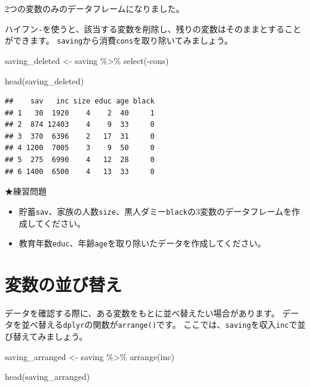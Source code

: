 \documentclass[
]{book}
\newenvironment{Shaded}{\begin{snugshade}}{\end{snugshade}}
\newcommand{\FunctionTok}[1]{\textcolor[rgb]{0.00,0.00,0.00}{#1}}
\newcommand{\NormalTok}[1]{#1}
\newcommand{\OtherTok}[1]{\textcolor[rgb]{0.56,0.35,0.01}{#1}}
\newcommand{\SpecialCharTok}[1]{\textcolor[rgb]{0.00,0.00,0.00}{#1}}
\providecommand{\tightlist}{%
  \setlength{\itemsep}{0pt}\setlength{\parskip}{0pt}}
\begin{document}
2つの変数のみのデータフレームになりました。

ハイフン\texttt{-}を使うと、該当する変数を削除し、残りの変数はそのままとすることができます。
\texttt{saving}から消費\texttt{cons}を取り除いてみましょう。

\begin{Shaded}
\begin{Highlighting}[]
\NormalTok{saving\_deleted }\OtherTok{\textless{}{-}}
\NormalTok{  saving }\SpecialCharTok{\%\textgreater{}\%}
    \FunctionTok{select}\NormalTok{(}\SpecialCharTok{{-}}\NormalTok{cons)}

\FunctionTok{head}\NormalTok{(saving\_deleted)}
\end{Highlighting}
\end{Shaded}

\begin{verbatim}
##    sav   inc size educ age black
## 1   30  1920    4    2  40     1
## 2  874 12403    4    9  33     0
## 3  370  6396    2   17  31     0
## 4 1200  7005    3    9  50     0
## 5  275  6990    4   12  28     0
## 6 1400  6500    4   13  33     0
\end{verbatim}

★練習問題

\begin{itemize}
\tightlist
\item
  貯蓄\texttt{sav}、家族の人数\texttt{size}、黒人ダミー\texttt{black}の3変数のデータフレームを作成してください。
\item
  教育年数\texttt{educ}、年齢\texttt{age}を取り除いたデータを作成してください。
\end{itemize}

\hypertarget{ux5909ux6570ux306eux4e26ux3073ux66ffux3048}{%
\section{変数の並び替え}\label{ux5909ux6570ux306eux4e26ux3073ux66ffux3048}}

データを確認する際に、ある変数をもとに並べ替えたい場合があります。
データを並べ替える\texttt{dplyr}の関数が\texttt{arrange()}です。
ここでは、\texttt{saving}を収入\texttt{inc}で並び替えてみましょう。

\begin{Shaded}
\begin{Highlighting}[]
\NormalTok{saving\_arranged }\OtherTok{\textless{}{-}}
\NormalTok{  saving }\SpecialCharTok{\%\textgreater{}\%}
    \FunctionTok{arrange}\NormalTok{(inc)}

\FunctionTok{head}\NormalTok{(saving\_arranged)}
\end{Highlighting}
\end{Shaded}
\end{document}
